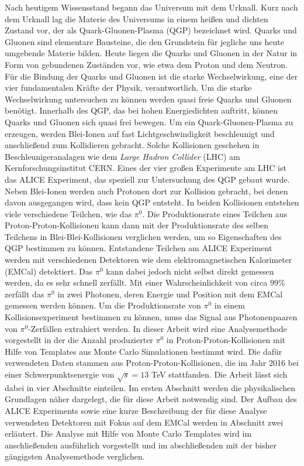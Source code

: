 Nach heutigem Wissensstand begann das Universum mit dem Urknall.
Kurz nach dem Urknall lag die Materie des Universums in einem heißen und dichten Zustand vor, der als Quark-Gluonen-Plasma (QGP) bezeichnet wird.
Quarks und Gluonen sind elementare Bausteine, die den Grundstein für jegliche uns heute umgebende Materie bilden.
Heute liegen die Quarks und Gluonen in der Natur in Form von gebundenen Zuständen vor, wie etwa dem Proton und dem Neutron.
\newline
Für die Bindung der Quarks und Gluonen ist die starke Wechselwirkung, eine der vier fundamentalen Kräfte der Physik, verantwortlich.
Um die starke Wechselwirkung untersuchen zu können werden quasi freie Quarks und Gluonen benötigt.
Innerhalb des QGP, das bei hohen Energiedichten auftritt, können Quarks und Gluonen sich quasi frei bewegen.
\newline
Um ein Quark-Gluonen-Plasma zu erzeugen, werden Blei-Ionen auf fast Lichtgeschwindigkeit beschleunigt und anschließend zum Kollidieren gebracht.
Solche Kollisionen geschehen in Beschleunigeranalagen wie dem \textit{Large Hadron Collider} (LHC) am Kernforschungsinstitut CERN.
Eines der vier großen Experimente am LHC ist das ALICE Experiment, das speziell zur Untersuchung des QGP gebaut wurde.
\newline
Neben Blei-Ionen werden auch Protonen dort zur Kollision gebracht, bei denen davon ausgegangen wird, dass kein QGP entsteht.
In beiden Kollisionen entstehen viele verschiedene Teilchen, wie das $\pi^{0}$.
Die Produktionsrate eines Teilchen aus Proton-Proton-Kollisionen kann dann mit der Produktionsrate des selben Teilchens in Blei-Blei-Kollisionen verglichen werden, um so Eigenschaften des QGP bestimmen zu können.
\newline
Entstandene Teilchen am ALICE Experiment werden mit verschiedenen Detektoren wie dem elektromagnetischen Kalorimeter (EMCal) detektiert.
Das $\pi^{0}$ kann dabei jedoch nicht selbst direkt gemessen werden, da es sehr schnell zerfällt.
Mit einer Wahrscheinlichkeit von circa $99\%$ zerfällt das $\pi^{0}$ in zwei Photonen, deren Energie und Position mit dem EMCal gemessen werden können.
Um die Produktionsrate von $\pi^{0}$ in einem Kollisionsexperiment bestimmen zu können, muss das Signal aus Photonenpaaren von $\pi^{0}$-Zerfällen extrahiert werden.
\newline
In dieser Arbeit wird eine Analysemethode vorgestellt in der die Anzahl produzierter $\pi^{0}$ in Proton-Proton-Kollisionen mit Hilfe von Templates aus Monte Carlo Simulationen bestimmt wird.
Die dafür verwendeten Daten stammen aus Proton-Proton-Kollisionen, die im Jahr 2016 bei einer Schwer\-punkts\-en\-er\-gie von $\sqrt{s}=13$ TeV stattfanden.
\newline
Die Arbeit lässt sich dabei in vier Abschnitte einteilen.
Im ersten Abschnitt werden die physikalischen Grundlagen näher dargelegt, die für diese Arbeit notwendig sind.
Der Aufbau des ALICE Experiments sowie eine kurze Beschreibung der für diese Analyse verwendeten Detektoren mit Fokus auf dem EMCal werden in Abschnitt zwei erläutert.
Die Analyse mit Hilfe von Monte Carlo Templates wird im anschließenden ausführlich vorgestellt und im  abschließenden mit der bisher gängigsten Analysemethode verglichen.